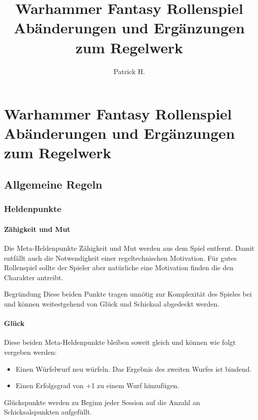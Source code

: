 \documentclass[a4paper,10pt,twoside,twocolumn,openany,nodeprecatedcode,bg=print]{dndbook}
\title{
  Warhammer Fantasy Rollenspiel\newline
  \large Abänderungen und Ergänzungen zum Regelwerk
  }
\author{Patrick H.}
\date{}
\begin{document}


\part*{Warhammer Fantasy Rollenspiel\newline
        \large{Abänderungen und Ergänzungen zum Regelwerk}\newline
}
\vspace{1em}



\chapter{Allgemeine Regeln}
\section{Heldenpunkte}
\subsection{Zähigkeit und Mut}
Die Meta-Heldenpunkte Zähigkeit und Mut werden aus dem Spiel entfernt. 
Damit entfällt auch die Notwendigkeit einer regeltechnischen Motivation. 
Für gutes Rollenspiel sollte der Spieler aber natürliche eine Motivation finden die den Charakter antreibt.

\begin{DndComment}{Begründung}
  Diese beiden Punkte tragen unnötig zur Komplexität des Spieles bei und können weitestgehend von Glück und Schicksal abgedeckt werden.
\end{DndComment}

\subsection{Glück}
Diese beiden Meta-Heldenpunkte bleiben soweit gleich und können wie folgt vergeben werden:
\begin{itemize}
  \item Einen Würfelwurf neu würfeln. Das Ergebnis des zweiten Wurfes ist bindend.
  \item Einen Erfolgsgrad von +1 zu einem Wurf hinzufügen.
\end{itemize}
Glückspunkte werden zu Beginn jeder Session auf die Anzahl an Schicksalspunkten aufgefüllt.
\end{document}
